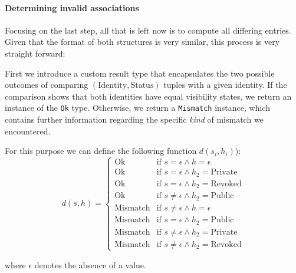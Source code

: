 \paragraph{Determining invalid associations}
Focusing on the last step, all that is left now is to compute all differing entries. Given that the format of both structures is very similar, this process is very straight forward: 

First we introduce a custom result type that encapsulates the two possible outcomes of comparing $(\text{Identity},\text{Status})$ tuples with a given identity. If the comparison shows that both identities have equal visibility states, we return an instance of the \texttt{Ok} type. Otherwise, we return a \texttt{Mismatch} instance, which contains further information regarding the specific \emph{kind} of mismatch we encountered. 

 For this purpose we can define the following function \(d(s_i,h_i)\)): 
\[
    d(s,h) = \begin{cases}
        \text{Ok} & \text{if } s = \epsilon \wedge h = \epsilon \\
        \text{Ok} & \text{if } s = \epsilon \wedge h_2 = \text{Private} \\
        \text{Ok} & \text{if } s = \epsilon \wedge h_2 = \text{Revoked} \\
        \text{Ok} & \text{if } s \neq \epsilon \wedge h_2 = \text{Public} \\

        \text{Mismatch} & \text{if } s \neq \epsilon \wedge h = \epsilon \\
        \text{Mismatch} & \text{if } s = \epsilon \wedge h_2 = \text{Public} \\
        \text{Mismatch} & \text{if } s \neq \epsilon \wedge h_2 = \text{Private} \\
        \text{Mismatch} & \text{if } s \neq \epsilon \wedge h_2 = \text{Revoked} 
    \end{cases}    
\]

where \(\epsilon\) denotes the absence of a value.

